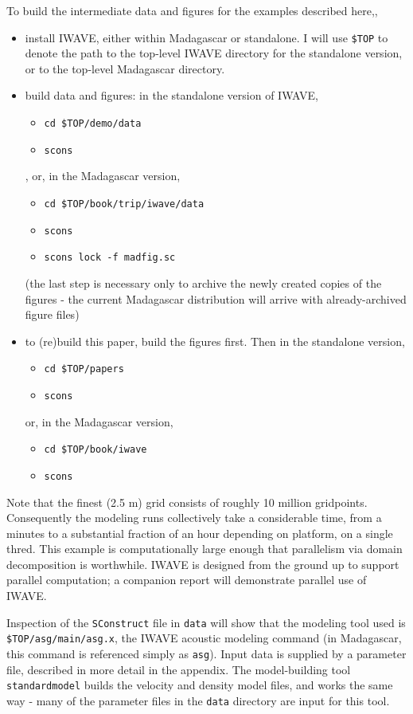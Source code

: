 To build the intermediate data and figures for  the examples described
here,,
\begin{itemize}
\item install IWAVE, either within Madagascar or standalone. I will use  {\tt \$TOP} to denote
  the path to the top-level IWAVE directory for the standalone
  version, or to the top-level Madagascar directory.
\item build data and figures: in the standalone version of IWAVE,
\begin{itemize}
  \item {\tt cd \$TOP/demo/data}
\item {\tt scons}
\end{itemize},
or, in the Madagascar version,
\begin{itemize}
\item {\tt cd \$TOP/book/trip/iwave/data}
\item {\tt scons}
\item {\tt scons lock -f madfig.sc}
\end{itemize}
(the last step is necessary only to archive the newly created copies
of the figures - the current Madagascar distribution will arrive with
already-archived figure files)
\item to (re)build this paper, build the figures first. Then in the standalone version,
\begin{itemize}
\item {\tt cd \$TOP/papers}
\item {\tt scons}
\end{itemize} 
or, in the Madagascar version,
\begin{itemize}
\item {\tt cd \$TOP/book/iwave}
\item {\tt scons}
\end{itemize}

\end{itemize}
Note that the finest (2.5 m) grid consists of roughly 10 million
gridpoints. Consequently the modeling runs collectively take a
considerable time, from a minutes to a substantial fraction of an hour
depending on platform,
on a single thred. This example is computationally large enough that
parallelism via domain decomposition is worthwhile. IWAVE is designed
from the ground up to support parallel computation; a companion report
will demonstrate parallel use of IWAVE.

Inspection of the {\tt SConstruct} file in {\tt data} will show that
the modeling tool used is {\tt \$TOP/asg/main/asg.x}, the IWAVE
acoustic modeling command (in Madagascar, this command is referenced
simply as {\tt asg}). Input data is supplied by a parameter file,
described in more detail in the appendix.
The model-building tool {\tt standardmodel} builds the velocity and
density model files, and works the same way - many of the parameter
files in the {\tt data} directory are input for this tool.

